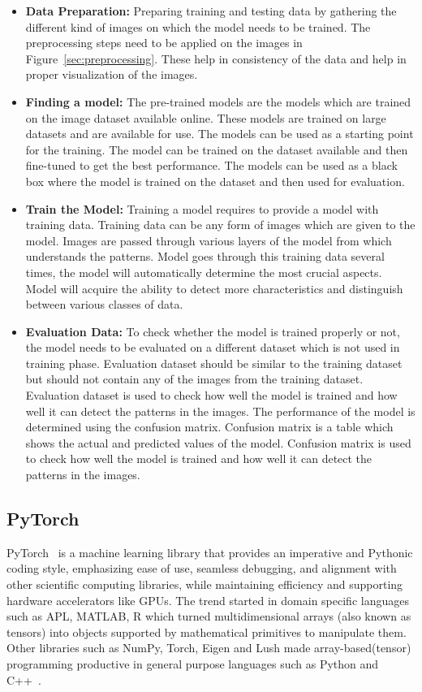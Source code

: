 \begin{itemize} 
    \item \textbf{Data Preparation:} 
    Preparing training and testing data by gathering the different kind of images on which the model needs to be trained. The preprocessing steps need to be applied on the images in Figure~\ref{sec:preprocessing}. These help in consistency of the data and help in proper visualization of the images.

    \item \textbf{Finding a model:} 
    The pre-trained models are the models which are trained on the image dataset available online. These models are trained on large datasets and are available for use. The models can be used as a starting point for the training. The model can be trained on the dataset available and then fine-tuned to get the best performance. The models can be used as a black box where the model is trained on the dataset and then used for evaluation. 

    \item \textbf{Train the Model:} 
    Training a model requires to provide a model with training data. Training data can be any form of images which are given to the model. Images are passed through various layers of the model from which understands the patterns. Model goes through this training data several times, the model will automatically determine the most crucial aspects. Model will acquire the ability to detect more characteristics and distinguish between various classes of data.

    \item \textbf{Evaluation Data:}
    To check whether the model is trained properly or not, the model needs to be evaluated on a different dataset which is not used in training phase. Evaluation dataset should be similar to the training dataset but should not contain any of the images from the training dataset. Evaluation dataset is used to check how well the model is trained and how well it can detect the patterns in the images. The performance of the model is determined using the confusion matrix. Confusion matrix is a table which shows the actual and predicted values of the model. Confusion matrix is used to check how well the model is trained and how well it can detect the patterns in the images. 
\end{itemize}

\subsection{PyTorch}\label{sec:PyTorch}
PyTorch~\cite{PyTorch_website} is a machine learning library that provides an imperative and Pythonic coding style, emphasizing ease of use, seamless debugging, and alignment with other scientific computing libraries, while maintaining efficiency and supporting hardware accelerators like GPUs. The trend started in domain specific languages such as APL, MATLAB, R which turned multidimensional arrays (also known as tensors) into objects supported by mathematical primitives to manipulate them. Other libraries such as NumPy, Torch, Eigen and Lush made array-based(tensor) programming productive in general purpose languages such as Python and C++~\cite{pytorch}. 

